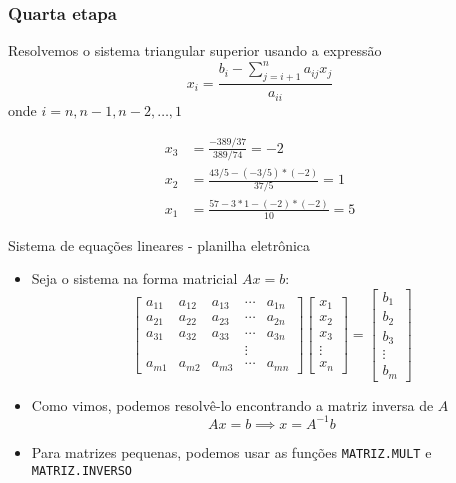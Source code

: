 \begin{frame}
    \frametitle{Quarta etapa}
    Resolvemos o sistema triangular superior usando a expressão
    \[
        x_i = \frac{b_i - \sum_{j=i+1}^{n} {a_{ij} x_j}}{a_{ii}}
    \]
    onde \(i = n, n-1, n-2, \ldots , 1\)

    \begin{align*}
        x_3 &= \frac{-389/37}{389/74}=-2 \\
        x_2 & =\frac{43/5 - (-3/5)*(-2)}{37/5}=1 \\
        x_1 &= \frac{57-3*1-(-2)*(-2)}{10} = 5
    \end{align*}

\end{frame}


\begin{frame}{Sistema de equações lineares - planilha eletrônica}
    \begin{itemize}
        \item Seja o sistema na forma matricial \(Ax=b\):
            \[
                \begin{bmatrix}
                    a_{11} & a_{12} & a_{13} & \cdots & a_{1n}  \\
                    a_{21} & a_{22} & a_{23} & \cdots & a_{2n}  \\
                    a_{31} & a_{32} & a_{33} & \cdots & a_{3n}  \\
                           &        &        & \vdots &         \\
                    a_{m1} & a_{m2} & a_{m3} & \cdots & a_{mn}
                \end{bmatrix}
                \begin{bmatrix}
                    x_1 \\ x_2 \\ x_3 \\ \vdots \\ x_n
                \end{bmatrix}=
                \begin{bmatrix}
                    b_1 \\ b_2 \\ b_3 \\ \vdots \\ b_m
                \end{bmatrix}
            \]
        \item Como vimos, podemos resolvê-lo encontrando a matriz inversa de \(A\)
            \[
                Ax=b \implies x=A^{-1}b
            \]
        \item Para matrizes pequenas, podemos usar as funções \texttt{MATRIZ.MULT} e \texttt{MATRIZ.INVERSO}
    \end{itemize}
\end{frame}
